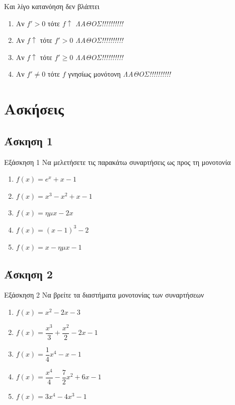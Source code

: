 \documentclass[greek]{beamer}
\begin{document}
\begin{frame}{Και λίγο κατανόηση δεν βλάπτει}
  \begin{enumerate}
    \item<1-> Αν $f'>0$ τότε $f\uparrow$  {\emph{ΛΑΘΟΣ!!!!!!!!!!}}
    \item<3-> Αν $f\uparrow$ τότε $f'>0$  {\emph{ΛΑΘΟΣ!!!!!!!!!!}}
    \item<5-> Αν $f\uparrow$ τότε $f'\ge 0$  {\emph{ΛΑΘΟΣ!!!!!!!!!!}}
    \item<7-> Αν $f'\ne 0$ τότε $f$ γνησίως μονότονη  {\emph{ΛΑΘΟΣ!!!!!!!!!!}}
  \end{enumerate}
\end{frame}

\section{Ασκήσεις}
\subsection{Άσκηση 1}
\begin{frame}[label=Άσκηση1]{Εξάσκηση 1}
  Να μελετήσετε τις παρακάτω συναρτήσεις ως προς τη μονοτονία
  \begin{enumerate}
    \item<1-> $f(x)=e^x+x-1$
    \item<2-> $f(x)=x^3-x^2+x-1$
    \item<3-> $f(x)=ημx-2x$
    \item<4-> $f(x)=(x-1)^3-2$
    \item<5-> $f(x)=x-ημx-1$
  \end{enumerate}

\end{frame}

\subsection{Άσκηση 2}
\begin{frame}[label=Άσκηση2]{Εξάσκηση 2}
  Να βρείτε τα διαστήματα μονοτονίας των συναρτήσεων
  \begin{enumerate}
    \item<1-> $f(x)=x^2-2x-3$
    \item<2-> $f(x)=\dfrac{x^3}{3}+\dfrac{x^2}{2}-2x-1$
    \item<3-> $f(x)=\dfrac{1}{4}x^4-x-1$
    \item<4-> $f(x)=\dfrac{x^4}{4}-\dfrac{7}{2}x^2+6x-1$
    \item<5-> $f(x)=3x^4-4x^3-1$
  \end{enumerate}

\end{frame}
\end{document}
